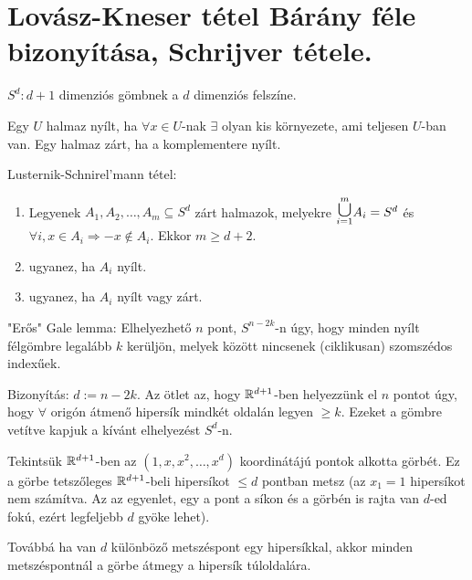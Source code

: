 \chapter{Lovász-Kneser tétel Bárány féle bizonyítása, Schrijver tétele.}

\begin{notation}
  $S^d: d+1$ dimenziós gömbnek a $d$ dimenziós felszíne.
\end{notation}

\begin{dfn}
  Egy $U$ halmaz nyílt, ha $\forall x \in U$-nak $\exists$ olyan kis környezete, ami teljesen $U$-ban van. Egy halmaz zárt, ha a komplementere nyílt.
\end{dfn}

\begin{thm} Lusternik-Schnirel'mann tétel:
  \begin{enumerate}
    \item Legyenek $A_1, A_2, \dots, A_m \subseteq S^d$ zárt halmazok, melyekre
    $\overset{m}{\underset{i=1}{\text{\LARGE $\cup$}}} A_i = S^d$ és $\forall i, x \in A_i \Rightarrow -x \not \in A_i$. Ekkor $m \geq d + 2$.
    \item ugyanez, ha $A_i$ nyílt.
    \item ugyanez, ha $A_i$ nyílt vagy zárt.
  \end{enumerate}
\end{thm}

\begin{thm} "Erős" Gale lemma:
  Elhelyezhető $n$ pont, $S^{n-2k}$-n úgy, hogy minden nyílt félgömbre legalább $k$ kerüljön, melyek között nincsenek (ciklikusan) szomszédos indexűek.
\end{thm}

Bizonyítás:
$d := n - 2k$. Az ötlet az, hogy $\mathbb{R}^{d+1}$-ben helyezzünk el $n$ pontot úgy, hogy $\forall$ origón átmenő hipersík mindkét oldalán legyen $\geq k$. Ezeket a gömbre vetítve kapjuk a kívánt elhelyezést $S^d$-n.

\medskip

Tekintsük $\mathbb{R}^{d+1}$-ben az $(1, x, x^2, \dots, x^d)$ koordinátájú pontok alkotta görbét. Ez a görbe tetszőleges $\mathbb{R}^{d+1}$-beli hipersíkot $\leq d$ pontban metsz (az $x_1 = 1$ hipersíkot nem számítva. Az az egyenlet, egy a pont a síkon és a görbén is rajta van $d$-ed fokú, ezért legfeljebb $d$ gyöke lehet).

\medskip

Továbbá ha van $d$ különböző metszéspont egy hipersíkkal, akkor minden metszéspontnál a görbe átmegy a hipersík túloldalára.

